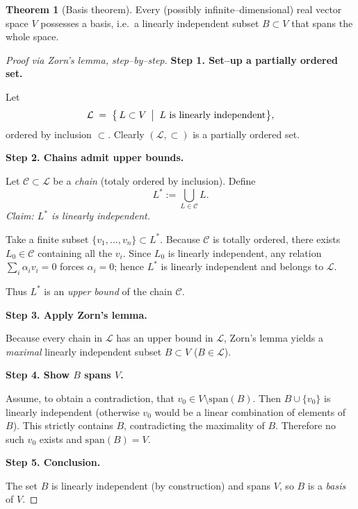 \documentclass[12pt]{article}
\theoremstyle{definition} %
\newtheorem{theorem}{Theorem}
\theoremstyle{plain} %
\begin{document}
\begin{theorem}[Basis theorem]
   Every (possibly infinite–dimensional) real vector space \(V\) possesses
   a basis, i.e.\ a linearly independent subset \(B\subset V\) that spans
   the whole space.
   \end{theorem}
   
   \begin{proof}[Proof via Zorn’s lemma, step–by–step]
   \textbf{Step 1.  Set–up a partially ordered set.}
   
   Let
   \[
      \mathcal L
         \;=\;
      \bigl\{\,L\subset V \,\bigm|\; L\text{ is linearly independent}\bigr\},
   \]
   ordered by inclusion \(\subset\).
   Clearly \((\mathcal L,\subset)\) is a partially ordered set.
   
   \medskip
   \textbf{Step 2.  Chains admit upper bounds.}
   
   Let \(\mathcal C\subset\mathcal L\) be a \emph{chain}
   (totaly ordered by inclusion).
   Define
   \[
      L^{\ast}:=\bigcup_{L\in\mathcal C} L .
   \]
   \emph{Claim: \(L^{\ast}\) is linearly independent.}
   
   Take a finite subset \(\{v_{1},\dots,v_{n}\}\subset L^{\ast}\).
   Because \(\mathcal C\) is totally ordered, there exists
   \(L_{0}\in\mathcal C\) containing all the \(v_{i}\).
   Since \(L_{0}\) is linearly independent, any relation
   \(\sum_{i} \alpha_{i}v_{i}=0\) forces \(\alpha_{i}=0\);
   hence \(L^{\ast}\) is linearly independent and belongs to \(\mathcal L\).
   
   Thus \(L^{\ast}\) is an \emph{upper bound} of the chain \(\mathcal C\).
   
   \medskip
   \textbf{Step 3.  Apply Zorn’s lemma.}
   
   Because every chain in \(\mathcal L\) has an upper bound in
   \(\mathcal L\), Zorn’s lemma yields a
   \emph{maximal} linearly independent subset \(B\subset V\)
   (\(B\in\mathcal L\)).
   
   \medskip
   \textbf{Step 4.  Show \(B\) spans \(V\).}
   
   Assume, to obtain a contradiction, that
   \(v_{0}\in V\setminus\mathrm{span}(B)\).
   Then \(B\cup\{v_{0}\}\) is linearly independent
   (otherwise \(v_{0}\) would be a linear combination of elements of \(B\)).
   This strictly contains \(B\), contradicting the maximality of \(B\).
   Therefore no such \(v_{0}\) exists and \(\mathrm{span}(B)=V\).
   
   \medskip
   \textbf{Step 5.  Conclusion.}
   
   The set \(B\) is linearly independent (by construction) and spans \(V\),
   so \(B\) is a \emph{basis} of \(V\).
   \end{proof}

   
\end{document}
